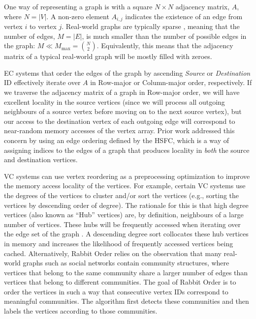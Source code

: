 \par One way of representing a graph is with a square $N \times N$ adjacency matrix, $A$, where $N= |V|$. A non-zero element $A_{i, j}$ indicates the existence of an edge from vertex $i$ to vertex $j$. Real-world graphs are typically sparse \cite{listingkcliques}, meaning that the number of edges, $M=|E|$, is much smaller than the number of possible edges in the graph: $M\ll M_{\max} = {N \choose 2}$. Equivalently, this means that the adjacency matrix of a typical real-world graph will be mostly filled with zeroes. 

\par \ac{EC} systems that order the edges of the graph by ascending \textit{Source} or \textit{Destination} ID effectively iterate over $A$ in Row-major or Column-major order, respectively. If we traverse the adjacency matrix of a graph in Row-major order, we will have excellent locality in the source vertices (since we will process all outgoing neighbours of a source vertex before moving on to the next source vertex), but our access to the destination vertex of each outgoing edge will correspond to near-random memory accesses of the vertex array. Prior work \cite{cost} addressed this concern by using an edge ordering defined by the \ac{HSFC}, which is a way of assigning indices to the edges of a graph that produces locality in \textit{both} the source and destination vertices. 

\par \ac{VC} systems can use vertex reordering as a preprocessing optimization to improve the memory access locality of the vertices. For example, certain \ac{VC} systems \cite{dbg, cagra} use the degrees of the vertices to cluster and/or sort the vertices (e.g., sorting the vertices by descending order of degree). The rationale for this is that high degree vertices (also known as ``Hub'' vertices) are, by definition, neighbours of a large number of vertices. These hubs will be frequently accessed when iterating over the edge set of the graph \cite{lwr}. A descending degree sort collocates these hub vertices in memory and increases the likelihood of frequently accessed vertices being cached. Alternatively, Rabbit Order \cite{rabbit} relies on the observation that many real-world graphs such as social networks contain community structures, where vertices that belong to the same community share a larger number of edges than vertices that belong to different communities. The goal of Rabbit Order is to order the vertices in such a way that consecutive vertex IDs correspond to meaningful communities. The algorithm first detects these communities and then labels the vertices according to those communities. 

